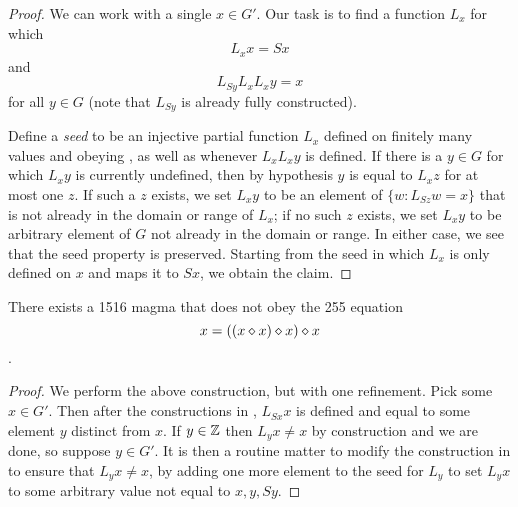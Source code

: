 \begin{proof}  We can work with a single $x \in G'$.  Our task is to find a function $L_x$ for which
\begin{equation}\label{axioma-again}
   L_x x = Sx
\end{equation}
and
\begin{equation}\label{axiomb-again}
  L_{Sy} L_x L_x y = x
\end{equation}
for all $y \in G$ (note that $L_{Sy}$ is already fully constructed).

Define a \emph{seed} to be an injective partial function $L_x$ defined on finitely many values and obeying , as well as  whenever $L_x L_x y$ is defined.  If there is a $y \in G$ for which $L_x y$ is currently undefined, then by hypothesis $y$ is equal to $L_x z$ for at most one $z$.  If such a $z$ exists, we set $L_x y$ to be an element of $\{ w: L_{Sz} w = x \}$ that is not already in the domain or range of $L_x$; if no such $z$ exists, we set $L_x y$ to be arbitrary element of $G$ not already in the domain or range.  In either case, we see that the seed property is preserved.  Starting from the seed in which $L_x$ is only defined on $x$ and maps it to $Sx$, we obtain the claim.
\end{proof}

\begin{corollary}\label{1516-no-255}  There exists a 1516 magma that does not obey the 255 equation $$x = ((x \diamond x) \diamond x) \diamond x$$.
\end{corollary}

\begin{proof}  We perform the above construction, but with one refinement.  Pick some $x \in G'$.  Then after the constructions in , $L_{Sx} x$ is defined and equal to some element $y$ distinct from $x$. If $y \in \mathbb{Z}$ then $L_y x \neq x$ by construction and we are done, so suppose $y \in G'$.  It is then a routine matter to modify the construction in  to ensure that $L_y x \neq x$, by adding one more element to the seed for $L_y$ to set $L_y x$ to some arbitrary value not equal to $x, y, Sy$.
\end{proof}

